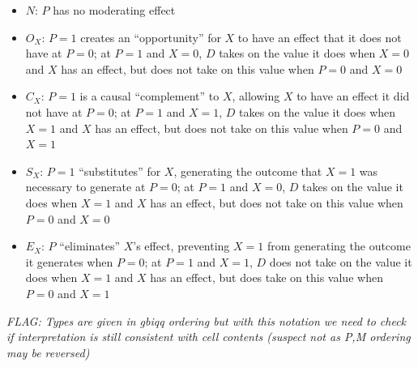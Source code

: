 \documentclass[12pt,]{book}
\begin{document}
\begin{itemize}
\item
  \(N\): \(P\) has no moderating effect
\item
  \(O_X\): \(P=1\) creates an ``opportunity'' for \(X\) to have an effect that it does not have at \(P=0\); at \(P=1\) and \(X=0\), \(D\) takes on the value it does when \(X=0\) and \(X\) has an effect, but does not take on this value when \(P=0\) and \(X=0\)
\item
  \(C_X\): \(P=1\) is a causal ``complement'' to \(X\), allowing \(X\) to have an effect it did not have at \(P=0\); at \(P=1\) and \(X=1\), \(D\) takes on the value it does when \(X=1\) and \(X\) has an effect, but does not take on this value when \(P=0\) and \(X=1\)
\item
  \(S_X\): \(P=1\) ``substitutes'' for \(X\), generating the outcome that \(X=1\) was necessary to generate at \(P=0\); at \(P=1\) and \(X=0\), \(D\) takes on the value it does when \(X=1\) and \(X\) has an effect, but does not take on this value when \(P=0\) and \(X=0\)
\item
  \(E_X\): \(P\) ``eliminates'' \(X\)'s effect, preventing \(X=1\) from generating the outcome it generates when \(P=0\); at \(P=1\) and \(X=1\), \(D\) does not take on the value it does when \(X=1\) and \(X\) has an effect, but does take on this value when \(P=0\) and \(X=1\)
\end{itemize}

\emph{FLAG: Types are given in gbiqq ordering but with this notation we need to check if interpretation is still consistent with cell contents (suspect not as P,M ordering may be reversed)}
\end{document}
